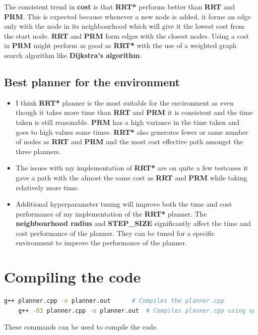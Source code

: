 \documentclass[11pt]{article}
\begin{document}
\noindent
The consistent trend in \textbf{cost} is that \textbf{RRT*} performs better than \textbf{RRT} and \textbf{PRM}.
This is expected because whenever a new node is added, it forms an edge only with the node in its neighbourhood which will give it the lowest cost from the start node. \textbf{RRT} and \textbf{PRM} form edges with the closest nodes. Using a cost in \textbf{PRM} might perform as good as \textbf{RRT*} with the use of a weighted graph search algorithm like \textbf{Dijkstra's algorithm}.
\subsection{Best planner for the environment}
\begin{itemize}
    
    \item I think \textbf{RRT*} planner is the most suitable for the environment as even though it takes more time than \textbf{RRT} and \textbf{PRM} it is consistent and the time taken is still reasonable. \textbf{PRM} has a high variance in the time taken and goes to high values some times. \textbf{RRT*} also generates fewer or same number of nodes as \textbf{RRT} and \textbf{PRM} and the most cost effective path amongst the three planners.
    \item The issues with my implementation of \textbf{RRT*} are on quite a few testcases it gave a path with the almost the same cost as \textbf{RRT} and \textbf{PRM} while taking relatively more time.  
    \item Additional hyperparameter tuning will improve both the time and cost performance of my implementation of the \textbf{RRT*} planner. The \textbf{neighbourhood radius} and \textbf{STEP\_SIZE} significantly affect the time and cost performance of the planner. They can be tuned for a specific environment to improve the performance of the planner. 
\end{itemize}
\newpage
\section{Compiling the code}
\begin{lstlisting}[language=bash]
    g++ planner.cpp -o planner.out      # Compiles the planner.cpp
    g++ -O3 planner.cpp -o planner.out  # Compiles planner.cpp using optimised compiler\end{lstlisting}
    
    These commands can be used to compile the code. 
\end{document}
